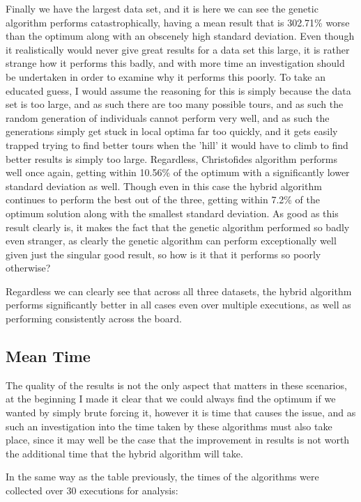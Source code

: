 \documentclass[11pt,a4paper,titlepage]{article}
\begin{document}
Finally we have the largest data set, and it is here we can see the genetic algorithm performs catastrophically, having a mean result that is 302.71\% worse than the optimum along with an obscenely high standard deviation. Even though it realistically would never give great results for a data set this large, it is rather strange how it performs this badly, and with more time an investigation should be undertaken in order to examine why it performs this poorly. To take an educated guess, I would assume the reasoning for this is simply because the data set is too large, and as such there are too many possible tours, and as such the random generation of individuals cannot perform very well, and as such the generations simply get stuck in local optima far too quickly, and it gets easily trapped trying to find better tours when the 'hill' it would have to climb to find better results is simply too large. Regardless, Christofides algorithm performs well once again, getting within 10.56\% of the optimum with a significantly lower standard deviation as well. Though even in this case the hybrid algorithm continues to perform the best out of the three, getting within 7.2\% of the optimum solution along with the smallest standard deviation. As good as this result clearly is, it makes the fact that the genetic algorithm performed so badly even stranger, as clearly the genetic algorithm can perform exceptionally well given just the singular good result, so how is it that it performs so poorly otherwise?

Regardless we can clearly see that across all three datasets, the hybrid algorithm performs significantly better in all cases even over multiple executions, as well as performing consistently across the board.

\subsection{Mean Time}

The quality of the results is not the only aspect that matters in these scenarios, at the beginning I made it clear that we could always find the optimum if we wanted by simply brute forcing it, however it is time that causes the issue, and as such an investigation into the time taken by these algorithms must also take place, since it may well be the case that the improvement in results is not worth the additional time that the hybrid algorithm will take.

\pagebreak

In the same way as the table previously, the times of the algorithms were collected over 30 executions for analysis: 
\end{document}
